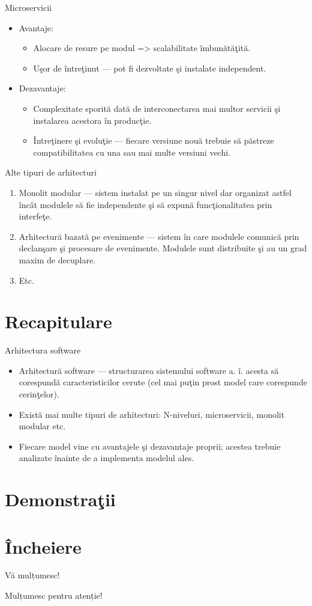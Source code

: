 \documentclass[presentation]{beamer}
\begin{document}
\begin{frame}[label={sec:org955539a}]{Microservicii}
\begin{itemize}
\item Avantaje:
\begin{itemize}
\item Alocare de resure pe modul => scalabilitate îmbunătăţită.
\item Uşor de întreţinut --- pot fi dezvoltate şi instalate independent.
\end{itemize}
\item Dezavantaje:
\begin{itemize}
\item Complexitate sporită dată de interconectarea mai multor servicii şi instalarea acestora în producţie.
\item Întreţinere şi evoluţie --- fiecare versiune nouă trebuie să păstreze compatibilitatea cu una sau mai multe versiuni vechi.
\end{itemize}
\end{itemize}
\end{frame}
\begin{frame}[label={sec:org0a0f0e8}]{Alte tipuri de arhitecturi}
\begin{enumerate}
\item \alert{Monolit modular} --- sistem instalat pe un singur nivel dar organizat astfel încât modulele să fie independente şi să expună funcţionalitatea prin interfeţe.
\item \alert{Arhitectură bazată pe evenimente} --- sistem în care modulele comunică prin declanşare şi procesare de evenimente. Modulele sunt distribuite şi au un grad maxim de decuplare.
\item Etc.
\end{enumerate}
\end{frame}
\section{Recapitulare}
\label{sec:org9c9c7e6}
\begin{frame}[label={sec:orgfbbceb1}]{Arhitectura software}
\pause
\begin{itemize}
\item \alert{Arhitectură software} --- structurarea sistemului software a. î. acesta să corespundă caracteristicilor cerute (cel mai puţin prost model care corespunde cerinţelor).
\pause
\item Există mai multe tipuri de arhitecturi: N-niveluri, microservicii, monolit modular etc.
\pause
\item Fiecare model vine cu avantajele şi dezavantaje proprii; acestea trebuie analizate înainte de a implementa modelul ales.
\end{itemize}
\end{frame}
\section{Demonstraţii}
\label{sec:org69c3b55}
\section{Încheiere}
\label{sec:org495ad58}
\begin{frame}[label={sec:orgcefc55b}]{Vă mulțumesc!}
\begin{center}
Mulțumesc pentru atenție!
\end{center}
\end{frame}
\end{document}
